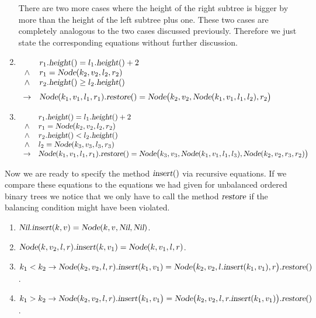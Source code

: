 \begin{enumerate}
      There are two more cases where the height of the right subtree is bigger by more than 
      the height of the left subtree plus one.  These two cases are completely analogous to the two
      cases discussed previously.  Therefore we just state the corresponding equations without
      further discussion.
\item $\begin{array}[t]{cl}
              & r_1.\textsl{height}() = l_1.\textsl{height}() + 2    \\ 
       \wedge & r_1 = \textsl{Node}(k_2,v_2,l_2,r_2)               \\
       \wedge & r_2.\textsl{height}() \geq l_2.\textsl{height}()     \\[0.2cm]
       \rightarrow & \textsl{Node}(k_1,v_1,l_1,r_1).\textsl{restore}() = 
                     \textsl{Node}\bigl(k_2,v_2,\textsl{Node}(k_1,v_1,l_1,l_2),r_2\bigr)
       \end{array}
      $
\item $\begin{array}[t]{cl}
               & r_1.\textsl{height}() = l_1.\textsl{height}() + 2    \\ 
        \wedge & r_1 = \textsl{Node}(k_2,v_2,l_2,r_2)               \\
        \wedge & r_2.\textsl{height}() < l_2.\textsl{height}()     \\
        \wedge & l_2 = \textsl{Node}(k_3,v_3,l_3,r_3)               \\
        \rightarrow & \textsl{Node}(k_1,v_1,l_1,r_1).\textsl{restore}() = 
                      \textsl{Node}\bigl(k_3,v_3,\textsl{Node}(k_1,v_1,l_1,l_3),\textsl{Node}(k_2,v_2,r_3,r_2) \bigr)
        \end{array}
       $

\end{enumerate}
Now we are ready to specify the method  $\textsl{insert}()$ via recursive equations.
If we compare these equations to the equations we had given for unbalanced ordered binary trees we
notice that we only have to call the method $\textsl{restore}$ if the balancing condition might have
been violated.
\begin{enumerate}
\item $\textsl{Nil}.\textsl{insert}(k,v) = \textsl{Node}(k,v, \textsl{Nil}, \textsl{Nil})$.  
\item $\textsl{Node}(k, v_2, l, r).\textsl{insert}(k,v_1) = \textsl{Node}(k, v_1, l, r)$.
\item $k_1 < k_2 \rightarrow 
          \textsl{Node}(k_2, v_2, l, r).\textsl{insert}(k_1, v_1) =
          \textsl{Node}\bigl(k_2, v_2, l.\textsl{insert}(k_1,v_1), r\bigr).\textsl{restore}()$.
\item $k_1 > k_2 \rightarrow 
         \textsl{Node}(k_2, v_2, l, r).\textsl{insert}\bigl(k_1, v_1\bigr) = 
         \textsl{Node}\bigl(k_2, v_2, l, r.\textsl{insert}(k_1,v_1)\bigr).\textsl{restore}()$.
\end{enumerate}
